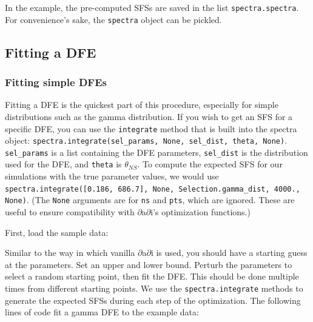 \documentclass[12pt]{article}
\newcommand{\dadi}{$\partial$a$\partial$i\xspace}
\begin{document}
In the example, the pre-computed SFSs are saved in the list \texttt{spectra.spectra}. For convenience's sake, the \texttt{spectra} object can be pickled.




\subsection{Fitting a DFE}

\subsubsection{Fitting simple DFEs}

Fitting a DFE is the quickest part of this procedure, especially for simple distributions such as the gamma distribution. If you wish to get an SFS for a specific DFE, you can use the \texttt{integrate} method that is built into the spectra object: \texttt{spectra.integrate(sel\_params, None, sel\_dist, theta, None)}. \texttt{sel\_params} is a list containing the DFE parameters, \texttt{sel\_dist} is the distribution used for the DFE, and \texttt{theta} is $\theta_{NS}$. To compute the expected SFS for our simulations with the true parameter values, we would use \texttt{spectra.integrate([0.186, 686.7], None, Selection.gamma\_dist, 4000., None)}. (The \texttt{None} arguments are for \texttt{ns} and \texttt{pts}, which are ignored. These are useful to ensure compatibility with \dadi's optimization functions.)

First, load the sample data:



Similar to the way in which vanilla $\partial$a$\partial$i is used, you should have a starting guess at the parameters. Set an upper and lower bound. Perturb the parameters to select a random starting point, then fit the DFE. This should be done multiple times from different starting points. We use the \texttt{spectra.integrate} methods to generate the expected SFSs during each step of the optimization. The following lines of code fit a gamma DFE to the example data:


\end{document}
